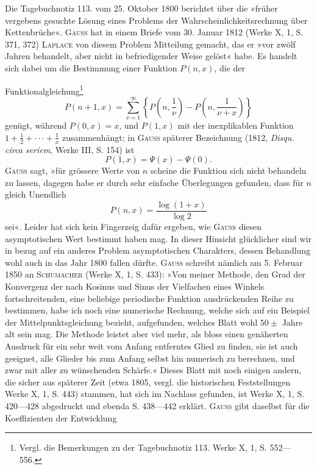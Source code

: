 Die Tagebuchnotiz 113. vom 25. Oktober 1800 berichtet über die »früher
vergebens gesuchte Lösung eines Problems der Wahrscheinlichkeitsrechnung
über Kettenbrüche«. \textsc{Gauss} hat in einem Briefe vom 30. Januar 1812 (Werke
X, 1, S. 371, 372) \textsc{Laplace} von diesem Problem Mitteilung gemacht, das er
»vor zwölf Jahren behandelt, aber nicht in befriedigender Weise gelöst« habe.
Es handelt sich dabei um die Bestimmung einer Funktion \(P(n,x)\), die der\par
\clearpage{}
\noindent Funktionalgleichung\footnote{Vergl. die Bemerkungen zu der Tagebuchnotiz 113. Werke X, 1, S. 552—556.}
\[
P(n+1,x)=\sum_{\nu=1}^{\infty}\left\{P\left(n,\frac1\nu\right)-P\left(n,\frac1{\nu+x}\right)\right\}
\]
genügt, während \(P(0,x)=x\), und \(P(1,x)\) mit der inexplikablen Funktion
\(1+\frac12+\cdot\cdot\cdot+\frac1x\) zusammenhängt; in \textsc{Gauss} späterer Bezeichnung (1812, \textit{Disqu.
circa seriem}, Werke III, S. 154) ist
\[
P(1,x)=\Psi(x)-\Psi(0).
\]
\textsc{Gauss} sagt, »für grössere Werte von \(n\) scheine die Funktion sich nicht behandeln
zu lassen, dagegen habe er durch sehr einfache Überlegungen gefunden,
dass für \(n\) gleich Unendlich
\[
P(n,x)=\frac{\log(1+x)}{\log2}
\]
sei«. Leider hat sich kein Fingerzeig dafür ergeben, wie \textsc{Gauss} diesen asymptotischen
Wert bestimmt haben mag. In dieser Hinsicht glücklicher sind wir
in bezug auf ein anderes Problem asymptotischen Charakters, dessen Behandlung
wohl auch in das Jahr 1800 fallen dürfte. \textsc{Gauss} schreibt nämlich am
5. Februar 1850 an \textsc{Schumacher} (Werke X, 1, S. 433): »Von meiner Methode,
den Grad der Konvergenz der nach Kosinus und Sinus der Vielfachen eines
Winkels fortschreitenden, eine beliebige periodische Funktion ausdrückenden
Reihe zu bestimmen, habe ich noch eine numerische Rechnung, welche sich
auf ein Beispiel der Mittelpunktsgleichung bezieht, aufgefunden, welches Blatt
wohl \(50\pm\) Jahre alt sein mag. Die Methode leistet aber viel mehr, als bloss
einen genäherten Ausdruck für ein sehr weit vom Anfang entferntes Glied
zu finden, sie ist auch geeignet, alle Glieder bis zum Anfang selbst hin
numerisch zu berechnen, und zwar mit aller zu wünschenden Schärfe.« Dieses
Blatt mit noch einigen andern, die sicher aus späterer Zeit (etwa 1805, vergl.
die historischen Feststellungen Werke X, 1, S. 443) stammen, hat sich im
Nachlass gefunden, ist Werke X, 1, S. 420—428 abgedruckt und ebenda
S. 438—442 erklärt. \textsc{Gauss} gibt daselbst für die Koeffizienten der Entwicklung
